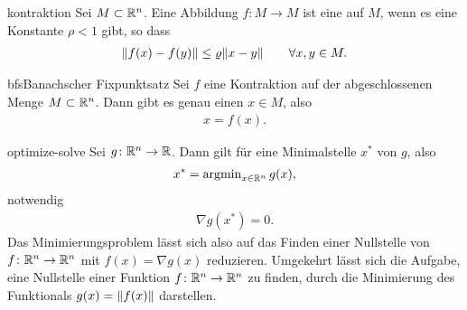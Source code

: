 \begin{Definition}{kontraktion}
  Sei $M\subset\mathbb R^n$. Eine Abbildung $f\colon M\to M$ ist eine  auf $M$, wenn es eine Konstante $\rho < 1$ gibt, so dass
  \begin{gather}
    \lVert f(x) - f(y)\rVert \le \varrho \lVert x-y\rVert \qquad\forall x,y\in M.
  \end{gather}
\end{Definition}

\begin{Satz*}{bfs}{Banachscher Fixpunktsatz}
  Sei $f$ eine Kontraktion auf der abgeschlossenen Menge $M\subset\mathbb R^n$. Dann gibt es genau einen  $x\in M$, also
  \begin{gather}
    x = f(x).
  \end{gather}
\end{Satz*}

\begin{Satz}{optimize-solve}
  Sei $g\colon \mathbb R^n\to \mathbb R$. Dann gilt für eine Minimalstelle $x^*$ von $g$,
  also
  \begin{gather}
    x^* = \operatorname{argmin}_{x\in\mathbb R^n} g(x),
  \end{gather}
  notwendig
  \begin{gather}
    \nabla g(x^*) = 0.
  \end{gather}
  Das Minimierungsproblem lässt sich also auf das Finden einer
  Nullstelle von $f\colon \mathbb R^n\to \mathbb R^n$ mit $f(x) = \nabla g(x)$
  reduzieren. Umgekehrt lässt sich die Aufgabe, eine Nullstelle einer
  Funktion $f\colon \mathbb R^n \to \mathbb R^n$ zu finden, durch die Minimierung
  des Funktionals $g(x) = \lVert f(x)\rVert$ darstellen.
\end{Satz}

